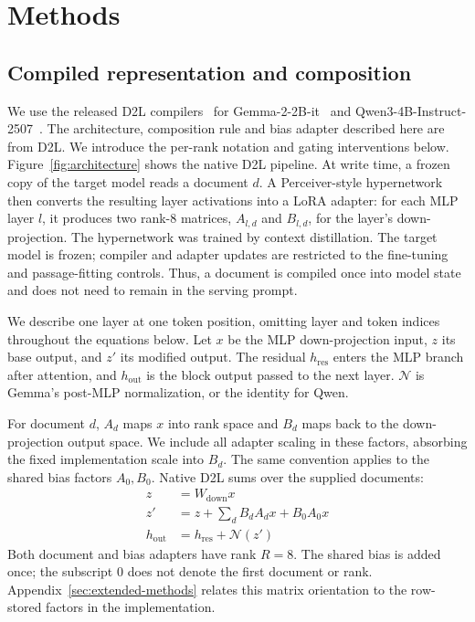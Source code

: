 \section{Methods}
\label{sec:methods}

\subsection{Compiled representation and composition}
\label{sec:d2l}

We use the released D2L compilers~\citep{charakorn2026doctolora} for
Gemma-2-2B-it~\citep{gemmateam2024gemma2} and Qwen3-4B-Instruct-2507~\citep{yang2025qwen3}.
The architecture, composition rule and bias adapter described here are from D2L.
We introduce the per-rank notation and gating interventions below.
Figure~\ref{fig:architecture} shows the native D2L pipeline. At write time, a
frozen copy of the target model reads a document $d$. A Perceiver-style
hypernetwork then converts the resulting layer activations into a LoRA
adapter: for each MLP layer $l$, it produces two rank-8 matrices,
$A_{l,d}$ and $B_{l,d}$, for the layer's down-projection. The hypernetwork was
trained by context distillation. The target model is frozen; compiler and
adapter updates are restricted to the fine-tuning and passage-fitting controls.
Thus, a document is compiled once
into model state and does not need to remain in the serving prompt.

We describe one layer at one token position, omitting layer and token indices
throughout the equations below. Let $x$ be the MLP down-projection input,
$z$ its base output, and $z'$ its modified output. The residual $h_{\mathrm{res}}$
enters the MLP branch after attention, and $h_{\mathrm{out}}$ is the block output
passed to the next layer. $\mathcal{N}$ is Gemma's post-MLP normalization,
or the identity for Qwen.

For document $d$, $A_d$ maps $x$ into rank space and $B_d$ maps back to the
down-projection output space. We include all adapter scaling in these factors,
absorbing the fixed implementation scale into $B_d$. The same convention
applies to the shared bias factors $A_0,B_0$. Native D2L sums over the supplied documents:
\begin{equation}
\begin{aligned}
z&=W_{\mathrm{down}}x\\
z'&=z+\sum_d B_dA_dx+B_0A_0x\\
h_{\mathrm{out}}&=h_{\mathrm{res}}+\mathcal{N}(z')
\end{aligned}
\label{eq:sum}
\end{equation}
Both document and bias adapters have rank $R=8$. The shared bias is added once;
the subscript 0 does not denote the first document or rank.
Appendix~\ref{sec:extended-methods} relates this matrix orientation to the
row-stored factors in the implementation.

